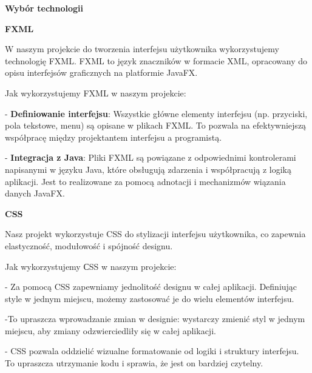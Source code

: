 \documentclass[a4paper]{article}
\newcommand\textstyleStrong[1]{\textbf{#1}}
\begin{document}
{\centering
\foreignlanguage{polish}{\textbf{Wybór technologii}}
\par}
\vspace{6pt}
{\centering
\foreignlanguage{polish}{\textbf{FXML}}
\par}
\vspace{6pt}
\foreignlanguage{polish}{W naszym projekcie do tworzenia interfejsu użytkownika wykorzystujemy technologię FXML. FXML to
język znaczników w formacie XML, opracowany do opisu interfejsów graficznych na platformie JavaFX.}

\foreignlanguage{polish}{Jak wykorzystujemy FXML w naszym projekcie:}

\foreignlanguage{polish}{{}- }\textstyleStrong{\foreignlanguage{polish}{Definiowanie
interfejsu}}\foreignlanguage{polish}{: Wszystkie główne elementy interfejsu (np. przyciski, pola tekstowe, menu) są
opisane w plikach FXML. To pozwala na efektywniejszą współpracę między projektantem interfejsu a programistą.}

\foreignlanguage{polish}{{}- }\textstyleStrong{\foreignlanguage{polish}{Integracja z Java}}\foreignlanguage{polish}{:
Pliki FXML są powiązane z odpowiednimi kontrolerami napisanymi w języku Java, które obsługują zdarzenia i współpracują
z logiką aplikacji. Jest to realizowane za pomocą adnotacji i mechanizmów wiązania danych JavaFX.}


\bigskip


\bigskip

{\centering
\foreignlanguage{polish}{\textbf{CSS}}
\par}
\vspace{6pt}
\foreignlanguage{polish}{Nasz projekt wykorzystuje CSS do stylizacji interfejsu użytkownika, co zapewnia elastyczność,
modułowość i spójność designu.}

\foreignlanguage{polish}{Jak wykorzystujemy }С\foreignlanguage{polish}{SS w naszym projekcie:}

\foreignlanguage{polish}{{}- Za pomocą CSS zapewniamy jednolitość designu w całej aplikacji. Definiując style w jednym
miejscu, możemy zastosować je do wielu elementów interfejsu.}

\foreignlanguage{polish}{{}-To upraszcza wprowadzanie zmian w designie: wystarczy zmienić styl w jednym miejscu, aby
zmiany odzwierciedliły się w całej aplikacji.}

\foreignlanguage{polish}{{}- CSS pozwala oddzielić wizualne formatowanie od logiki i struktury interfejsu. To upraszcza
utrzymanie kodu i sprawia, że jest on bardziej czytelny.}
\end{document}

